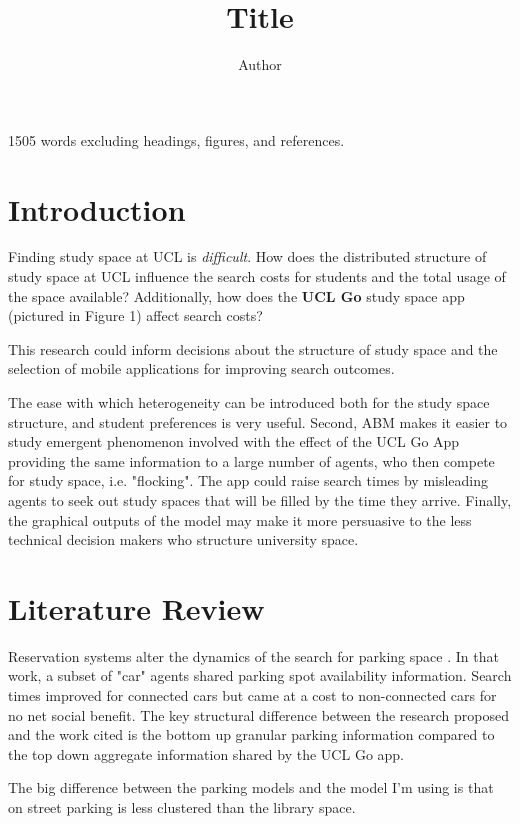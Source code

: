 \documentclass[11pt]{article} %
\title{\vspace{-3.0cm}Title}
\author{Author}
\begin{document}
\maketitle

1505 words excluding headings, figures, and references. \\

\section{Introduction}

Finding study space at UCL is \textit{difficult}.  How does the distributed structure of study space at UCL influence the search costs for students and the total usage of the space available? Additionally, how does the \textbf{UCL Go} study space app (pictured in Figure 1) affect search costs? 

This research could inform decisions about the structure of study space and the selection of mobile applications for improving search outcomes.

The ease with which heterogeneity can be introduced both for the study space structure, and student preferences is very useful. Second, ABM makes it easier to study emergent phenomenon involved with the effect of the UCL Go App providing the same information to a large number of agents, who then compete for study space, i.e. "flocking". The app could raise search times by misleading agents to seek out study spaces that will be filled by the time they arrive.   Finally, the graphical outputs of the model may make it more persuasive to the less technical decision makers who structure university space.\\

\section{Literature Review}

Reservation systems alter the dynamics of the search for parking space \parencite{TasseronG.2017Upsr}. In that work, a subset of "car" agents shared parking spot availability information. Search times improved for connected cars but came at a cost to non-connected cars for no net social benefit. The key structural difference between the research proposed and the work cited is the bottom up granular parking information compared to the top down aggregate information shared by the UCL Go app.

The big difference between the parking models and the model I'm using is that on street parking is less clustered than the library space. 
\end{document}
